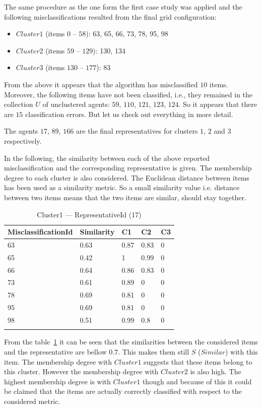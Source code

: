 The same procedure as the one form the first case study was applied and the following misclassifications resulted from the final grid configuration:
\begin{itemize}
\item $Cluster1$ (items $0$ -- $58$): 63, 65, 66, 73, 78, 95, 98
\item $Cluster2$ (items $59$ -- $129$): 130, 134 
\item $Cluster3$ (items $130$ -- $177$): 83
\end{itemize}
From the above it appears that the algorithm has misclassified $10$ items. Moreover, the following items have not been classified, i.e., they remained in the collection $U$ of unclustered agents: $59$, $110$, $121$, $123$, $124$. So it appears that there are $15$ classification errors. But let us check out everything in more detail.

The agents $17$, $89$, $166$ are the final representatives for clusters $1$, $2$ and $3$ respectively.

In the following, the similarity between each of the above reported misclassification and the corresponding representative is given. The membership degree to each cluster is also considered. The Euclidean distance between items has been used as a similarity metric. So a small similarity value i.e. distance between two items means that the two items are similar, should stay together.

\begin{table}[h!]
\begin{tabular}{lllll}
\cline{1-5}
MisclassificationId & Similarity  & C1 & C2 & C3\\ 
\hline
63 & 0.63 & 0.87 & 0.83 & 0\\
65 & 0.42 & 1 & 0.99 & 0\\
66 & 0.64 & 0.86 & 0.83 & 0\\
73 & 0.61 & 0.89 & 0 & 0\\
78 & 0.69 & 0.81 & 0 & 0\\
95 & 0.69 & 0.81 & 0 & 0\\
98 & 0.51 & 0.99 & 0.8 & 0\\
\hline \\
\end{tabular} 
\caption{Cluster1 --- RepresentativeId (17)}
\label{tab:cluster1id17}
\end{table}

From the table~\ref{tab:cluster1id17} it can be seen  that the similarities between the considered items and the representative are bellow $0.7$. This makes them still $S$ ($Similar$) with this item. The membership degree with $Cluster1$ suggests that these items belong to this cluster. However the membership degree with $Cluster2$ is also high. The highest membership degree is with $Cluster1$ though and because of this it could be claimed that the items are actually correctly classified with respect to the considered metric. 

